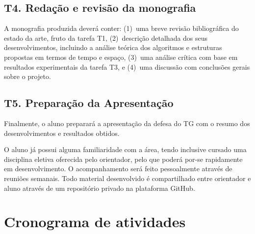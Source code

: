 \documentclass[12pt, a4paper, oneside]{article}
\begin{document}
\subsection*{T4. Redação e revisão da monografia}

A monografia produzida deverá conter:
(1)~uma breve revisão bibliográfica do estado da arte, fruto da tarefa T1, (2)~descrição detalhada dos seus desenvolvimentos, incluindo a análise teórica dos algoritmos e estruturas propostas em termos de tempo e espaço, (3)~uma análise crítica com base em resultados experimentais da tarefa T3, e (4)~uma discussão com conclusões gerais sobre o projeto.


\subsection*{T5. Preparação da Apresentação}

Finalmente, o aluno preparará a apresentação da defesa do TG com o resumo dos desenvolvimentos e resultados obtidos.

\medskip

O aluno já possui alguma familiaridade com a área, tendo inclusive cursado uma disciplina eletiva oferecida pelo orientador, pelo que poderá por-se rapidamente em desenvolvimento. O acompanhamento será feito pessoalmente através de reuniões semanais. Todo material desenvolvido é compartilhado entre orientador e aluno através de um repositório privado na plataforma GitHub. 

\clearpage
\section{Cronograma de atividades}
\end{document}
